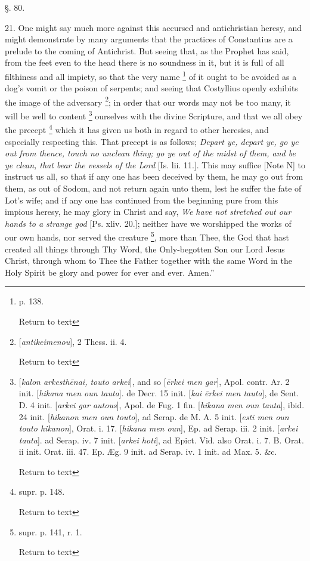 §. 80.

21. One might say much more against this accursed
and antichristian heresy, and might demonstrate by many
arguments that the practices of Constantius are a prelude to the
coming of Antichrist. But seeing that, as the Prophet has said, from
the feet even to the head there is no soundness in it, but it is full
of all filthiness and all impiety, so that the very name \footnote{p. 138.

Return to text} of
it ought to be avoided as a dog's vomit or the poison of serpents; and
seeing that Costyllius openly exhibits the image of the adversary \footnote{[\emph{antikeimenou}], 2 Thess. ii. 4.

Return to text}; in order that our words may not be too many, it will be
well to content \footnote{[\emph{kalon arkesth\={e}nai, touto arkei}],
and so [\emph{\={e}rkei men gar}], Apol. contr. Ar. 2 init. [\emph{hikana
men oun tauta}]. de Decr. 15 init. [\emph{kai \={e}rkei men tauta}],
de Sent. D. 4 init. [\emph{arkei gar autous}], Apol. de Fug. 1 fin. [\emph{hikana
men oun tauta}], ibid. 24 init. [\emph{hikanon men oun touto}], ad
Serap. de M. A. 5 init. [\emph{esti men oun touto hikanon}], Orat. i.
17. [\emph{hikana men oun}], Ep. ad Serap. iii. 2 init. [\emph{arkei
tauta}]. ad Serap. iv. 7 init. [\emph{arkei hoti}], ad Epict. Vid.
also Orat. i. 7. B. Orat. ii init. Orat. iii. 47. Ep. Æg. 9 init. ad
Serap. iv. 1 init. ad Max. 5. \&c.

Return to text} ourselves with the divine Scripture, and that
we all obey the precept \footnote{supr. p. 148.

Return to text} which it has given us both in regard
to other heresies, and especially respecting this. That precept is as
follows; \emph{Depart ye, depart ye, go ye out from thence, touch no
unclean thing; go ye out of the midst of them, and be ye clean, that
bear the vessels of the Lord} [Is. lii. 11.]. This may suffice [Note
N] to instruct us all, so that if any one has been deceived by
them, he may go out from them, as out of Sodom, and not return again
unto them, lest he suffer the fate of Lot's wife; and if any one has
continued from the beginning pure from this impious heresy, he may
glory in Christ and say, \emph{We have not stretched out our hands to a
strange god} [Ps. xliv. 20.]; neither have we worshipped the works
of our own hands, nor served the creature \footnote{supr. p. 141, r. 1.

Return to text}, more than Thee,
the God that hast created all things through Thy Word, the
Only-begotten Son our Lord Jesus Christ, through whom to Thee the
Father together with the same Word in the Holy Spirit be glory and
power for ever and ever. Amen.''

